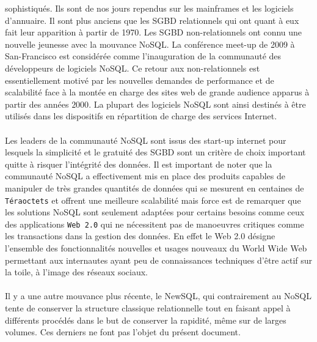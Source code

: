 sophistiqués\cite{BDDR}. Ils sont de nos jours rependus sur les mainframes et les
logiciels d'annuaire. Il sont plus anciens que les \textsf{SGBD}
relationnels qui ont quant à eux fait leur apparition à partir de 1970\cite{BDDR}. Les
\textsf{SGBD} non-relationnels ont connu une nouvelle jeunesse avec la
mouvance \textsf{NoSQL}. La conférence meet-up de 2009
à \textsf{San-Francisco} est considérée comme l'inauguration de la
communauté des développeurs de logiciels \textsf{NoSQL}. Ce retour aux
non-relationnels est essentiellement motivé par les nouvelles demandes
de performance et de scalabilité face à la montée en charge des sites
web de grande audience apparus à partir des années $2000$. La plupart des
logiciels \textsf{NoSQL} sont ainsi destinés à être utilisés dans les
dispositifs en répartition de charge des services \textsf{Internet}.
\\ 
\\ 
Les leaders de la communauté \textsf{NoSQL} sont issus
des \textsf{start-up} internet pour lesquels la simplicité et le
gratuité des \textsf{SGBD} sont un critère de choix important quitte à
risquer l'intégrité des données. Il est important de noter que la
communauté
\textsf{NoSQL} a effectivement mis en place des produits capables de
manipuler de très grandes quantités de données qui se mesurent en
centaines de \texttt{Téraoctets} et offrent une meilleure scalabilité
mais force est de remarquer que les solutions \textsf{NoSQL} sont
seulement adaptées pour certains besoins comme ceux des applications
\texttt{Web 2.0} qui ne nécessitent pas de manoeuvres critiques comme
les transactions dans la gestion des données.  En effet le \textsf{Web
2.0} désigne l'ensemble des fonctionnalités nouvelles et usages
nouveaux du \textsf{World Wide Web} permettant aux internautes ayant
peu de connaissances techniques d’être actif sur la toile, à l’image
des réseaux sociaux.
\\
\\ 
Il y a une autre mouvance plus récente, le
\textsf{NewSQL}, qui contrairement au \textsf{NoSQL}
tente de conserver la structure classique relationnelle tout en
faisant appel à différents procédés dans le but de conserver la
rapidité, même sur de larges volumes\cite{newSQL}. Ces derniers ne
font pas l'objet du présent document.
